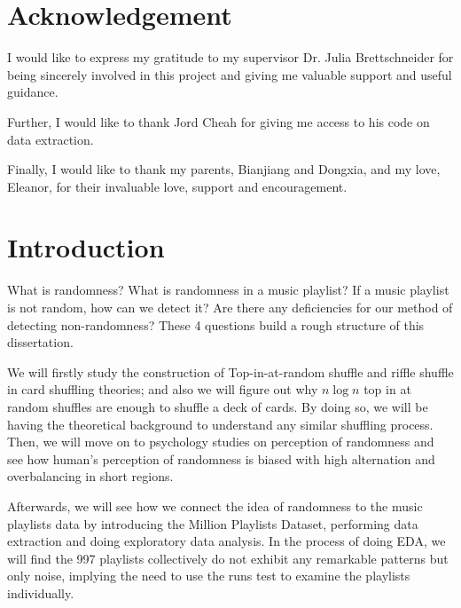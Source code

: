\documentclass[12pt]{article}
\theoremstyle{plain}
\theoremstyle{definition}
\theoremstyle{remark}
\begin{document}
\hfill

\hfill

\hfill

\hfill

\section*{Acknowledgement}
I would like to express my gratitude to my supervisor Dr. Julia Brettschneider for being sincerely involved in this project and giving me valuable support and useful guidance. 

Further, I would like to thank Jord Cheah for giving me access to his code on data extraction.

Finally, I would like to thank my parents, Bianjiang and Dongxia, and my love, Eleanor, for their invaluable love, support and encouragement.

\clearpage

\tableofcontents

\clearpage


\section{Introduction}
What is randomness? What is randomness in a music playlist? If a music playlist is not random, how can we detect it? Are there any deficiencies for our method of detecting non-randomness? These 4 questions build a rough structure of this dissertation.

We will firstly study the construction of Top-in-at-random shuffle and riffle shuffle in card shuffling theories; and also we will figure out why $n\log n$ top in at random shuffles are enough to shuffle a deck of cards. By doing so, we will be having the theoretical background to understand any similar shuffling process. Then, we will move on to psychology studies on perception of randomness and see how human's perception of randomness is biased with high alternation and overbalancing in short regions. 

Afterwards, we will see how we connect the idea of randomness to the music playlists data by introducing the Million Playlists Dataset, performing data extraction and doing exploratory data analysis. In the process of doing EDA, we will find the 997 playlists collectively do not exhibit any remarkable patterns but only noise, implying the need to use the runs test to examine the playlists individually.
\end{document}
